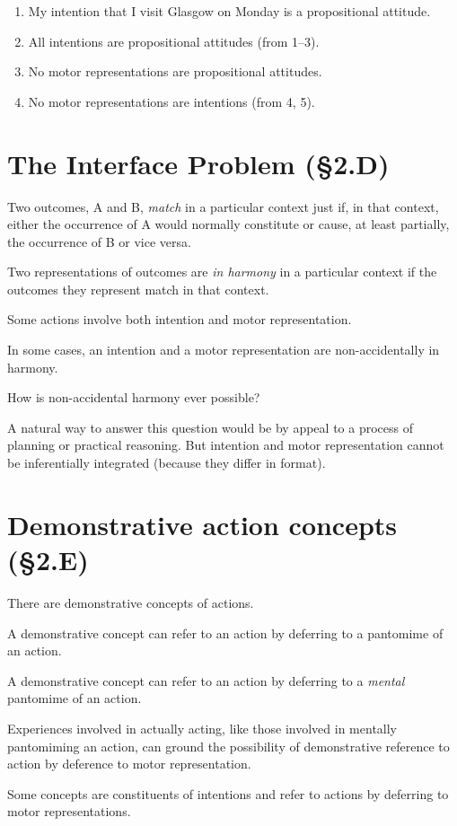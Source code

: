 \documentclass[11pt]{extarticle}
\begin{document}
\begin{multicols}{3}
\begin{enumerate}
\item My intention that I visit Glasgow on Monday is a propositional attitude.

\item All intentions are propositional attitudes (from 1--3).

\item No motor representations are propositional attitudes.

\item No motor representations are intentions (from 4, 5).
\end{enumerate}





\section{The Interface Problem (§2.D)}
Two  outcomes, A and B, \emph{match} in a particular context just if, in that context, either the occurrence of A would normally constitute or cause, at least partially, the occurrence of B or vice versa. 

Two representations of outcomes are \emph{in harmony} in a particular context if the outcomes they represent match in that context.

Some actions involve both  intention and motor representation.

In some cases, an intention and a motor representation are non-accidentally in harmony.

How is non-accidental harmony ever possible?

A natural way to answer this question would be by appeal to a process of planning or practical reasoning.
But intention and motor representation cannot be inferentially integrated (because they differ in format).  


\section{Demonstrative action concepts (§2.E)}
There are demonstrative concepts of actions.

A demonstrative concept can refer to an action by deferring to a pantomime of an action.

A demonstrative concept can refer to an action by deferring to a \emph{mental} pantomime of an action.

Experiences involved in actually acting, like those involved in mentally pantomiming an action, can ground the possibility of demonstrative reference to action by deference to motor representation.

Some concepts are constituents of intentions and refer to actions by deferring to motor representations.



\end{multicols}
\end{document}
